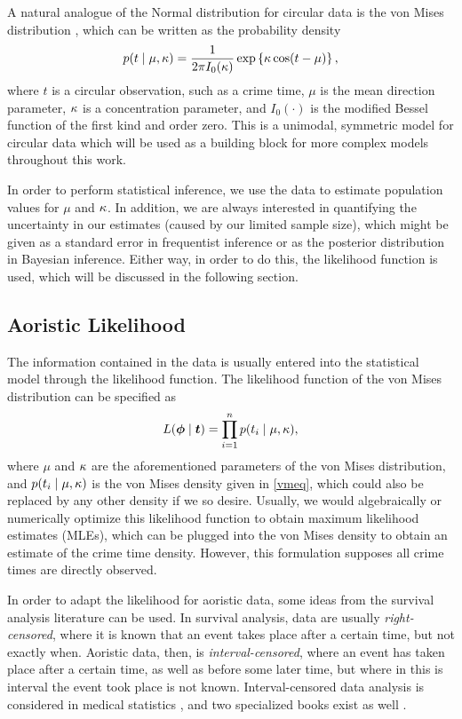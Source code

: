 A natural analogue of the Normal distribution for circular data is the von Mises distribution \citep{von1918ganzzahligkeit}, which can be written as the probability density
\begin{equation} \label{vmeq}
p(t \mid \mu, \kappa) = \frac{1}{2\pi I_0(\kappa)} \exp\left\{\kappa \cos(t - \mu)\right\},
\end{equation}
where $t$ is a circular observation, such as a crime time, $\mu$ is the mean direction parameter, $\kappa$ is a concentration parameter, and $I_0(\cdot)$ is the modified Bessel function of the first kind and order zero. This is a unimodal, symmetric model for circular data which will be used as a building block for more complex models throughout this work.

In order to perform statistical inference, we use the data to estimate population values for $\mu$ and $\kappa$. In addition, we are always interested in quantifying the uncertainty in our estimates (caused by our limited sample size), which might be given as a standard error in frequentist inference or as the posterior distribution in Bayesian inference. Either way, in order to do this, the likelihood function is used, which will be discussed in the following section.

\subsection{Aoristic Likelihood} \label{aolik}

The information contained in the data is usually entered into the statistical model through the likelihood function. The likelihood function of the von Mises distribution can be specified as
\begin{equation}
L(\boldsymbol{\phi} \mid \boldsymbol{t} ) = \prod_{i = 1}^n p(t_i \mid \mu, \kappa),
\end{equation}
where \( \mu\) and \(\kappa\) are the aforementioned parameters of the von Mises distribution, and \( p(t_i \mid \mu, \kappa) \) is the von Mises density given in \ref{vmeq}, which could also be replaced by any other density if we so desire. Usually, we would algebraically or numerically optimize this likelihood function to obtain maximum likelihood estimates  (MLEs), which can be plugged into the von Mises density to obtain an estimate of the crime time density. However, this formulation supposes all crime times are directly observed.

In order to adapt the likelihood for aoristic data, some ideas from the survival analysis literature can be used. In survival analysis, data are usually \textit{right-censored}, where it is known that an event takes place after a certain time, but not exactly when. Aoristic data, then, is \textit{interval-censored}, where an event has taken place after a certain time, as well as before some later time, but where in this is interval the event took place is not known. Interval-censored data analysis is considered in medical statistics \citep{klein2013handbook}, and two specialized books exist as well \citep{sun2007statistical, chen2012interval}.


